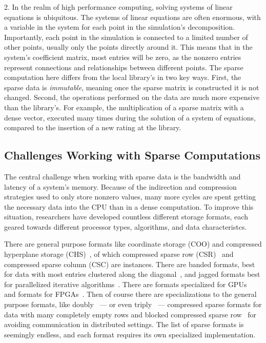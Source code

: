 2. 
In the realm of high performance computing, solving systems of linear equations is ubiquitous.
The systems of linear equations are often enormous, with a variable in the system for each point in the simulation's decomposition.
Importantly, each point in the simulation is connected to a limited number of other points, usually only the points directly around it.
This means that in the system's coefficient matrix, most entries will be zero, as the nonzero entries represent connections and relationships between different points.
The sparse computation here differs from the local library's in two key ways.
First, the sparse data is \textit{immutable}, meaning once the sparse matrix is constructed it is not changed.
Second, the operations performed on the data are much more expensive than the library's.
For example, the multiplication of a sparse matrix with a dense vector, executed many times during the solution of a system of equations, compared to the insertion of a new rating at the library.

\subsection{Challenges Working with Sparse Computations}

The central challenge when working with sparse data is the bandwidth and latency of a system's memory.
Because of the indirection and compression strategies used to only store nonzero values, many more cycles are spent getting the necessary data into the CPU than in a dense computation.
To improve this situation, researchers have developed countless different storage formats, each geared towards different processor types, algorithms, and data characteristcs.

There are general purpose formats like coordinate storage (COO) and compressed hyperplane storage (CHS)~\cite{ahmed2000compiling}, of which compressed sparse row (CSR)~\cite{gustavson1972some} and compressed sparse column (CSC) are instances.
There are banded formats, best for data with most entries clustered along the diagonal~\cite{jennings1966compact}, and jagged formats best for parallelized iterative algorithms~\cite{saad1989krylov,montagne2004optimal}.
There are formats specialized for GPUs~\cite{fan2004gpu,bell2009implementing,bell2008efficient,monakov2010automatically} and formats for FPGAs~\cite{sun2007sparse,kestur2012towards,fowers2014high}.
Then of course there are specializations to the general purpose formats, like doubly~\cite{buluc2008representation} --- or even triply~\cite{mofrad2019efficient} --- compressed sparse formats for data with many completely empty rows and blocked compressed sparse row~\cite{vuduc2005fast} for avoiding communication in distributed settings.
The list of sparse formats is seemingly endless, and each format requires its own specialized implementation.

